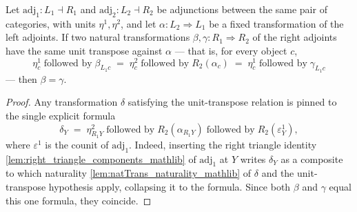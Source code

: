 \begin{lemma}
  \label{lem:natTrans_ext_of_unit}
  Let \(\mathrm{adj}_1 : L_1 \dashv R_1\) and \(\mathrm{adj}_2 : L_2 \dashv R_2\) be
  adjunctions between the same pair of categories, with units \(\eta^1, \eta^2\), and
  let \(\alpha : L_2 \Rightarrow L_1\) be a fixed transformation of the left adjoints.
  If two natural transformations \(\beta, \gamma : R_1 \Rightarrow R_2\) of the right
  adjoints have the same unit transpose against \(\alpha\) — that is, for every object
  \(c\),
  \[
    \eta^1_c \;\text{followed by}\; \beta_{L_1 c}
    \;=\; \eta^2_c \;\text{followed by}\; R_2(\alpha_c)
    \;=\; \eta^1_c \;\text{followed by}\; \gamma_{L_1 c}
  \]
  — then \(\beta = \gamma\).
\end{lemma}
\begin{proof}
  Any transformation \(\delta\) satisfying the unit-transpose relation is pinned to the
  single explicit formula
  \[
    \delta_Y \;=\; \eta^2_{R_1 Y} \;\text{followed by}\; R_2(\alpha_{R_1 Y})
      \;\text{followed by}\; R_2(\varepsilon^1_Y),
  \]
  where \(\varepsilon^1\) is the counit of \(\mathrm{adj}_1\). Indeed, inserting the
  right triangle identity \cref{lem:right_triangle_components_mathlib} of
  \(\mathrm{adj}_1\) at \(Y\) writes \(\delta_Y\) as a composite to which naturality
  \cref{lem:natTrans_naturality_mathlib} of \(\delta\) and the unit-transpose
  hypothesis apply, collapsing it to the formula. Since both \(\beta\) and \(\gamma\)
  equal this one formula, they coincide.
\end{proof}

